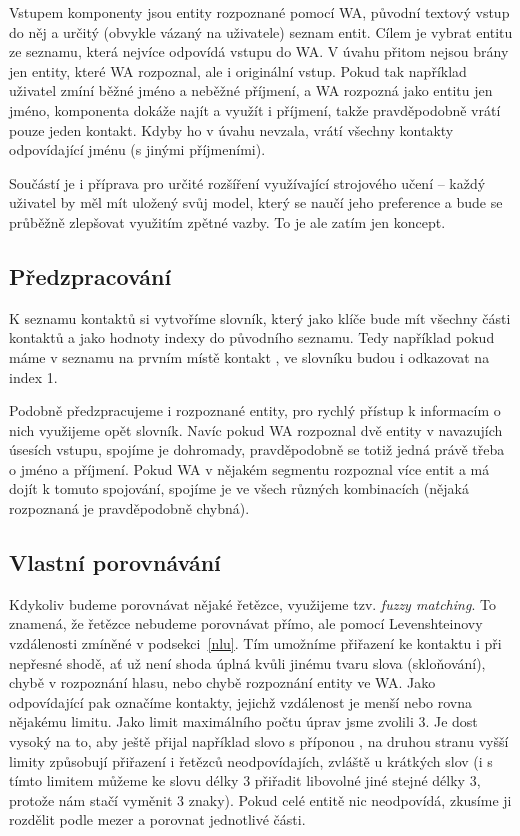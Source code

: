 Vstupem komponenty jsou entity rozpoznané pomocí WA, původní textový vstup do něj
a určitý (obvykle vázaný na uživatele) seznam entit. Cílem je vybrat entitu ze seznamu,
která nejvíce odpovídá vstupu do WA. V úvahu přitom nejsou brány jen entity, které
WA rozpoznal, ale i originální vstup. Pokud tak například uživatel zmíní běžné jméno a
neběžné příjmení, a WA rozpozná jako entitu jen jméno, komponenta dokáže najít a využít
i příjmení, takže pravděpodobně vrátí pouze jeden kontakt. Kdyby ho v úvahu nevzala,
vrátí všechny kontakty odpovídající jménu (s jinými příjmeními).

Součástí je i příprava pro určité rozšíření využívající strojového učení -- každý
uživatel by měl mít uložený svůj model, který se naučí jeho preference a bude se
průběžně zlepšovat využitím zpětné vazby. To je ale zatím jen koncept.

\subsection{Předzpracování}

K seznamu kontaktů si vytvoříme slovník,
který jako klíče bude mít všechny části kontaktů a jako hodnoty indexy do původního
seznamu. Tedy například pokud máme v seznamu na prvním místě kontakt ,
ve slovníku budou  i  odkazovat na index 1.

Podobně předzpracujeme i rozpoznané entity, pro rychlý přístup k informacím o nich
využijeme opět slovník. Navíc pokud WA rozpoznal dvě entity v navazujích úsesích vstupu,
spojíme je dohromady, pravděpodobně se totiž jedná právě třeba o jméno a příjmení.
Pokud WA v nějakém segmentu rozpoznal více entit a má dojít k tomuto spojování, spojíme
je ve všech různých kombinacích (nějaká rozpoznaná je pravděpodobně chybná).

\subsection{Vlastní porovnávání}

Kdykoliv budeme porovnávat nějaké řetězce, využijeme tzv. \textit{fuzzy matching}.
To znamená, že řetězce nebudeme porovnávat přímo, ale pomocí Levenshteinovy vzdálenosti
zmíněné v podsekci~\ref{nlu}. Tím umožníme přiřazení ke kontaktu i při nepřesné shodě,
ať už není shoda úplná kvůli jinému tvaru slova (skloňování), chybě v rozpoznání
hlasu, nebo chybě rozpoznání entity ve WA. Jako odpovídající pak označíme kontakty,
jejichž vzdálenost je menší nebo rovna nějakému limitu. Jako limit maximálního počtu
úprav jsme zvolili 3. Je dost vysoký na to, aby ještě přijal například slovo s příponou
, na druhou stranu vyšší limity způsobují přiřazení i řetězců neodpovídajích,
zvláště u krátkých slov (i s tímto limitem můžeme ke slovu délky 3 přiřadit libovolné jiné
stejné délky 3, protože nám stačí vyměnit 3 znaky). Pokud celé entitě nic neodpovídá,
zkusíme ji rozdělit podle mezer a porovnat jednotlivé části.


